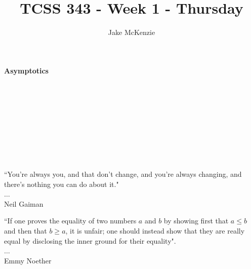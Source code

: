 \documentclass[12pt]{article}
\begin{document}
\title{TCSS 343 - Week 1 - Thursday}
\author{Jake McKenzie}
\maketitle
\noindent\centerline{\textbf{Asymptotics}}\\\\\\\\\\\\\\\\
\begin{center}
    ``You're always you, and that don't change, and you're always changing, and there's nothing you can do about it." \\$\dots$\\ Neil Gaiman
\end{center}
\begin{center}
    ``If one proves the equality of two numbers $a$ and $b$ by showing first that $a \leq b$ and then that $b \geq a$, it is unfair; one should instead show that they are really equal by disclosing the inner ground for their equality". \\$\dots$\\Emmy Noether
\end{center}
\newpage
\end{document}
